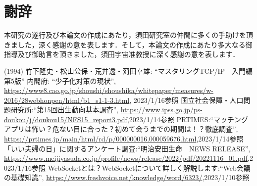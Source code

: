 \documentclass[12pt,a4j,titlepage]{ltjsarticle}
\begin{document}
\clearpage



\section{謝辞}
本研究の遂行及び本論文の作成にあたり，須田研究室の仲間に多くの手助けを頂きました，深く感謝の意を表します．そして，本論文の作成にあたり多大なる御指導及び御助言を頂きました，須田宇宙准教授に深く感謝の意を表します．

\clearpage

\begin{thebibliography}{99}
 (1994) 竹下隆史・松山公保・荒井透・苅田幸雄: ``マスタリングTCP/IP　入門編第5版''
 内閣府: ``少子化対策の現状'', \url{https://www8.cao.go.jp/shoushi/shoushika/whitepaper/measures/w-2016/28webhonpen/html/b1_s1-1-3.html}, 2023/1/16参照
国立社会保障・人口問題研究所:``第15回出生動向基本調査'',
\url{https://www.ipss.go.jp/ps-doukou/j/doukou15/NFS15_report3.pdf},2023/1/14参照
PRTIMES:``マッチングアプリは怖い？危ない目に合った？初めて会うまでの期間は！？徹底調査'',
\url{https://prtimes.jp/main/html/rd/p/000000016.000059676.html},2023/1/14参照
「いい夫婦の日」に関するアンケート調査:``明治安田生命　NEWS RELEASE'',
\url{https://www.meijiyasuda.co.jp/profile/news/release/2022/pdf/20221116_01.pdf},2023/1/16参照
WebSocketとは？WebSocketについて詳しく解説します:``Web会議の基礎知識'',
\url{https://www.freshvoice.net/knowledge/word/6323/},2023/1/10参照
\end{thebibliography}
\end{document}
